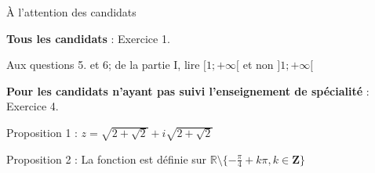 \documentclass[varwidth,convert]{standalone}
\begin{document}
\begin{center}
  \LARGE À l'attention des candidats
  \normalsize
\end{center}

\textbf{Tous les candidats} : Exercice 1.

Aux questions 5. et 6; de la partie I, lire $[1;+\infty[$ et non
$]1;+\infty[$

\textbf{Pour les candidats n'ayant pas suivi l'enseignement de
spécialité} : Exercice 4.

Proposition 1 : $z=\sqrt{2+\sqrt{2}} + i\sqrt{2+\sqrt{2}}$

Proposition 2 : La fonction est définie sur $\mathbb{R}\setminus \{
  -\frac{\pi}4 + k{\pi}, k\in \mathbf{Z} \}$
\end{document}
